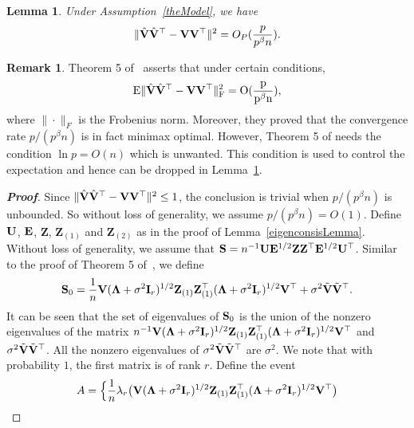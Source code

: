 \documentclass[times,sort&compress,3p]{elsarticle}
\newcommand{\myE}{\rm E}
\newcommand{\bZ}{\mathbf{Z}}
\theoremstyle{plain}
\newtheorem{lemma}{\quad\quad Lemma}
\theoremstyle{definition}
\newtheorem{remark}{\quad\quad Remark}
\theoremstyle{remark}
\begin{document}
\begin{appendices}
\begin{lemma}\label{conRateLemma}
    Under Assumption~\ref{theModel}, we have
\begin{equation*}
\|\hat{\mathbf{V}}\hat{\mathbf{V}}^\top -\mathbf{V}\mathbf{V}^\top \|^2 =O_P(\frac{p}{p^{\beta}n}).
\end{equation*}
\end{lemma}
\begin{remark}
    Theorem 5 of~\cite{Cai2012Sparse} asserts that under certain conditions,
$$
\myE \|\hat{\BV}\hat{\BV}^\top -\BV\BV^\top \|_F^2 =O(\frac{p}{p^{\beta}n}),
    $$
    where $\|\cdot\|_F$ is the Frobenius norm.
    Moreover, they proved that the convergence rate $p/(p^{\beta}n)$ is in fact minimax optimal.
    However,  Theorem 5 of \cite{Cai2012Sparse} needs the condition $\ln p=O(n)$ which is unwanted.
    This condition is used to control the expectation and hence can be dropped in Lemma~\ref{conRateLemma}.
\end{remark}
\begin{proof}[\textbf{Proof}]
    Since $\|\hat{\mathbf{V}}\hat{\mathbf{V}}^\top-\mathbf{V}\mathbf{V}^\top\|^2\leq 1$, the conclusion is trivial when $p/(p^{\beta} n)$ is unbounded.
    So without loss of generality, we assume $p/(p^{\beta} n)=O(1)$.
    Define $\mathbf{U}$, $\mathbf{E}$, $\bZ$, $\bZ_{(1)}$ and $\bZ_{(2)}$ as in the proof of Lemma~\ref{eigenconsisLemma}.
Without loss of generality, we assume that $\BS= n^{-1}\BU\BE^{1/2}\bZ \bZ^\top \BE^{1/2} \BU^\top$. 
    Similar to the proof of Theorem 5 of~\cite{Cai2012Sparse},
we define 
    $$
    \BS_0=
        \frac{1}{n}\BV(\bLambda+\sigma^2\BI_r)^{1/2}\bZ_{(1)} \bZ_{(1)}^\top(\bLambda+\sigma^2\BI_r)^{1/2}\BV^\top
        +\sigma^2\tilde{\BV}\tilde{\BV}^\top.
    $$
    It can be seen that the set of eigenvalues of $\mathbf{S}_0$ is the union of the nonzero eigenvalues of the matrix $n^{-1}\BV(\bLambda+\sigma^2\BI_r)^{1/2}\bZ_{(1)} \bZ_{(1)}^\top(\bLambda+\sigma^2\BI_r)^{1/2}\BV^\top$ and $\sigma^2\tilde{\mathbf{V}}\tilde{\mathbf{V}}^\top$.
All the nonzero eigenvalues of $\sigma^2\tilde{\mathbf{V}}\tilde{\mathbf{V}}^\top$ are $\sigma^2$.
We note that with probability $1$, the first matrix is of rank $r$.
        Define the event
        $$
        A=
        \Big\{
        \frac{1}{n}\lambda_r\big(\BV(\bLambda+\sigma^2 \BI_r)^{1/2}\bZ_{(1)} \bZ_{(1)}^\top(\bLambda+\sigma^2 \BI_r)^{1/2}\BV^\top\big)
$$
\end{proof}
\end{appendices}
\end{document}

